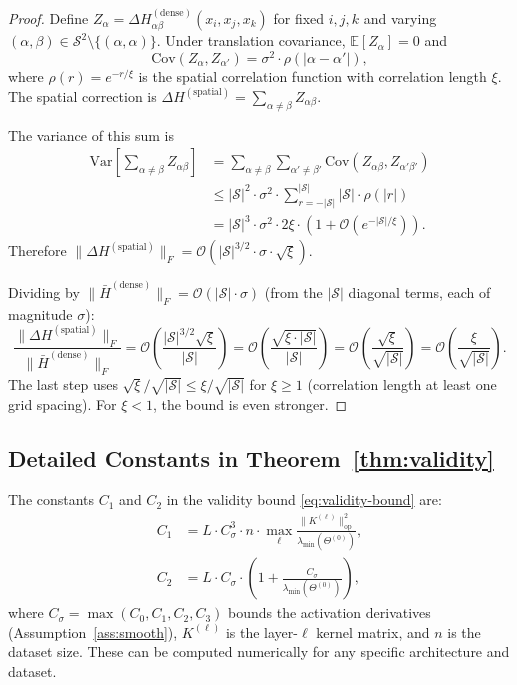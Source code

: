 \documentclass[11pt]{article}
\theoremstyle{definition}
\newcommand{\E}{\mathbb{E}}
\newcommand{\Var}{\mathrm{Var}}
\newcommand{\Cov}{\mathrm{Cov}}
\newcommand{\cS}{\mathcal{S}}
\newcommand{\cO}{\mathcal{O}}
\newcommand{\norm}[1]{\lVert #1 \rVert}
\renewcommand{\Theta}{\varTheta}
\begin{document}
\begin{proof}
Define $Z_\alpha = \Delta H^{(\mathrm{dense})}_{\alpha\beta}(x_i, x_j, x_k)$ for fixed $i,j,k$ and varying $(\alpha,\beta) \in \cS^2 \setminus \{(\alpha,\alpha)\}$. Under translation covariance, $\E[Z_\alpha] = 0$ and
\begin{equation}
\Cov(Z_\alpha, Z_{\alpha'}) = \sigma^2 \cdot \rho(|\alpha - \alpha'|),
\end{equation}
where $\rho(r) = e^{-r/\xi}$ is the spatial correlation function with correlation length $\xi$. The spatial correction is $\Delta H^{(\mathrm{spatial})} = \sum_{\alpha \neq \beta} Z_{\alpha\beta}$.

The variance of this sum is
\begin{align}
\Var\!\left[\sum_{\alpha \neq \beta} Z_{\alpha\beta}\right]
&= \sum_{\alpha \neq \beta} \sum_{\alpha' \neq \beta'} \Cov(Z_{\alpha\beta}, Z_{\alpha'\beta'}) \\
&\le |\cS|^2 \cdot \sigma^2 \cdot \sum_{r=-|\cS|}^{|\cS|} |\cS| \cdot \rho(|r|) \\
&= |\cS|^3 \cdot \sigma^2 \cdot 2\xi \cdot (1 + \cO(e^{-|\cS|/\xi})).
\end{align}
Therefore $\norm{\Delta H^{(\mathrm{spatial})}}_F = \cO(|\cS|^{3/2} \cdot \sigma \cdot \sqrt{\xi})$.

Dividing by $\norm{\bar{H}^{(\mathrm{dense})}}_F = \cO(|\cS| \cdot \sigma)$ (from the $|\cS|$ diagonal terms, each of magnitude $\sigma$):
\begin{equation}
\frac{\norm{\Delta H^{(\mathrm{spatial})}}_F}{\norm{\bar{H}^{(\mathrm{dense})}}_F} = \cO\!\left(\frac{|\cS|^{3/2} \sqrt{\xi}}{|\cS|}\right) = \cO\!\left(\frac{\sqrt{\xi \cdot |\cS|}}{|\cS|}\right) = \cO\!\left(\frac{\sqrt{\xi}}{\sqrt{|\cS|}}\right) = \cO\!\left(\frac{\xi}{\sqrt{|\cS|}}\right).
\end{equation}
The last step uses $\sqrt{\xi}/\sqrt{|\cS|} \le \xi/\sqrt{|\cS|}$ for $\xi \ge 1$ (correlation length at least one grid spacing). For $\xi < 1$, the bound is even stronger.
\end{proof}

\subsection{Detailed Constants in Theorem~\ref{thm:validity}}

The constants $C_1$ and $C_2$ in the validity bound \eqref{eq:validity-bound} are:
\begin{align}
C_1 &= L \cdot C_\sigma^3 \cdot n \cdot \max_\ell \frac{\norm{K^{(\ell)}}_{\mathrm{op}}^2}{\lambda_{\min}(\Theta^{(0)})}, \\
C_2 &= L \cdot C_\sigma \cdot \left(1 + \frac{C_\sigma}{\lambda_{\min}(\Theta^{(0)})}\right),
\end{align}
where $C_\sigma = \max(C_0, C_1, C_2, C_3)$ bounds the activation derivatives (Assumption~\ref{ass:smooth}), $K^{(\ell)}$ is the layer-$\ell$ kernel matrix, and $n$ is the dataset size. These can be computed numerically for any specific architecture and dataset.
\end{document}
